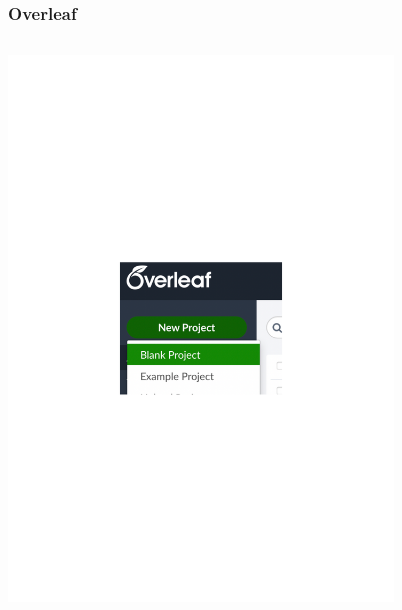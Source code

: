\documentclass{../../cursuspresentatie}
\begin{document}
\begin{frame}
	\frametitle{Overleaf}
	\begin{columns}
		\begin{column}{0.4\textwidth}
		  \includegraphics[width=0.8\textwidth]{images/new_project.pdf}\hfill
		\end{column}
		\begin{column}{0.4\textwidth}

\end{column}
\end{columns}
\end{frame}
\end{document}
